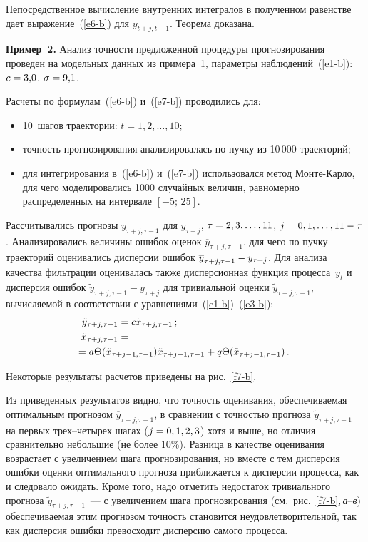 \begin{multicols}{2}
  
  Непосредственное вычисление внутренних интегралов в полученном равенстве дает 
выражение~(\ref{e6-b}) для $\overline{y}_{t+j,t-1}$. 
Теорема доказана.

  
  \smallskip
  
  \noindent
  \textbf{Пример~2.} Анализ точности предложенной процедуры прогнозирования 
проведен на модельных данных из примера~1, параметры наблюдений~(\ref{e1-b}): 
$c\hm=3{,}0$, $\sigma\hm=9{,}1$.
  
  Расчеты по формулам~(\ref{e6-b}) и~(\ref{e7-b}) проводились для:
  \begin{itemize}
  \item 10~шагов траектории: $t=1, 2, \ldots , 10$;
  \item точность прогнозирования анализировалась по пучку из 10\,000 траекторий;
\item для интегрирования в~(\ref{e6-b}) и~(\ref{e7-b}) использовался метод 
Мон\-те-Кар\-ло, для чего моделировались 1000 случайных величин, равномерно 
распределенных на интервале $[-5;\,25]$.
\end{itemize}

  Рассчитывались прогнозы $\overline{y}_{\tau+j,\tau-1}$ для $y_{\tau+j}$, $\tau\hm= 2, 3, 
\ldots , 11$, $j\hm=0, 1, \ldots , 11-\tau$. Анализировались величины ошибок оценок 
$\overline{y}_{\tau+j,\tau-1}$, для чего по пучку траекторий оценивались дисперсии ошибок 
$\overline{y}_{\tau+j,\tau-1}\hm-y_{\tau+j}$. Для анализа качества фильтрации оценивалась 
также дисперсионная функция процесса~$y_t$ и дисперсия ошибок $\tilde{y}_{\tau+j,\tau-1} 
-y_{\tau+j}$ для тривиальной оценки $\tilde{y}_{\tau+j,\tau-1}$, вычисляемой в соответствии 
с уравнениями~(\ref{e1-b})--(\ref{e3-b}):
\begin{align*}
  \tilde{y}_{\tau+j,\tau-1} &=c\tilde{x}_{\tau+j,\tau-1}\,;\\
  \tilde{x}_{\tau+j,\tau-1}&=\\
  &\hspace*{-15mm}{}=a\Theta(\tilde{x}_{\tau+j-1,\tau-1})\tilde{x}_{\tau+j-1,\tau-
1}+q\Theta(\tilde{x}_{\tau+j-1,\tau-1})\,.
  \end{align*}
  
  Некоторые результаты расчетов приведены на рис.~\ref{f7-b}.
  
  Из приведенных результатов видно, что точность оценивания, обеспечиваемая 
оптимальным прогнозом $\overline{y}_{\tau+j,\tau-1}$, в сравнении с точностью прогноза 
$\tilde{y}_{\tau+j,\tau-1}$ на первых трех--четырех шагах ($j \hm= 0, 1, 2, 3$) хотя и выше, но 
отличия сравнительно небольшие (не более 10\%). Разница в качестве оценивания возрастает 
с увеличением шага прогнозирования, но вместе с тем дисперсия ошибки оценки 
оптимального прогноза приближается к дисперсии процесса, как и следовало ожидать. 
Кроме того, надо отметить недостаток тривиального прогноза $\tilde{y}_{\tau+j,\tau-1}$~--- с 
увеличением шага прогнозирования (см.\ рис.~\ref{f7-b},\,\textit{а}--\textit{в}) 
обеспечиваемая этим  прогнозом точность становится неудовлетворительной, так как 
дисперсия ошибки  превосходит дисперсию самого процесса.


\end{multicols}
